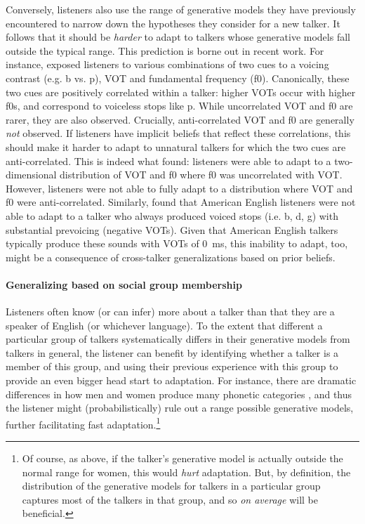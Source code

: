 Conversely, listeners also use the range of generative models they have previously encountered to narrow down the hypotheses they consider for a new talker.  It follows that it should be \emph{harder} to adapt to talkers whose generative models fall outside the typical range.  This prediction is borne out in recent work.  For instance, \textcite{Idemaru2011} exposed listeners to various combinations of two cues to a voicing contrast (e.g. \ph b vs. \ph p), VOT and fundamental frequency (f0).  Canonically, these two cues are positively correlated within a talker: higher VOTs occur with higher f0s, and correspond to voiceless stops like \ph p. While uncorrelated VOT and f0 are rarer, they are also observed. Crucially, anti-correlated VOT and f0 are generally \emph{not} observed. If listeners have implicit beliefs that reflect these correlations, this should make it harder to adapt to unnatural talkers for which the two cues are anti-correlated. This is indeed what \textcite{Idemaru2011} found: listeners were able to adapt to a two-dimensional distribution of VOT and f0 where f0 was uncorrelated with VOT.  However, listeners were not able to fully adapt to a distribution where VOT and f0 were anti-correlated. Similarly, \textcite{Sumner2011} found that American English listeners were not able to adapt to a talker who always produced voiced stops (i.e. \ph b, \ph d, \ph g) with substantial prevoicing (negative VOTs).  Given that American English talkers typically produce these sounds with VOTs of \SI{0}{\milli\second}, this inability to adapt, too, might be a consequence of cross-talker generalizations based on prior beliefs. 


\paragraph{Generalizing based on social group membership}
\label{sec:soci-group-memb}

Listeners often know (or can infer) more about a talker than that they are a speaker of English (or whichever language).  To the extent that different a particular group of talkers systematically differs in their generative models from talkers in general, the listener can benefit by identifying whether a talker is a member of this group, and using their previous experience with this group to provide an even bigger head start to adaptation.  For instance, there are dramatic differences in how men and women produce many phonetic categories \autocite[e.g.,][]{Hillenbrand1995,Jongman2000,McMurray2011a,Newman2001}, and thus the listener might (probabilistically) rule out a range possible generative models, further facilitating fast adaptation.\footnote{Of course, as above, if the talker's generative model is actually outside the normal range for women, this would \emph{hurt} adaptation.  But, by definition, the distribution of the generative models for talkers in a particular group captures most of the talkers in that group, and so \emph{on average} will be beneficial.}  

